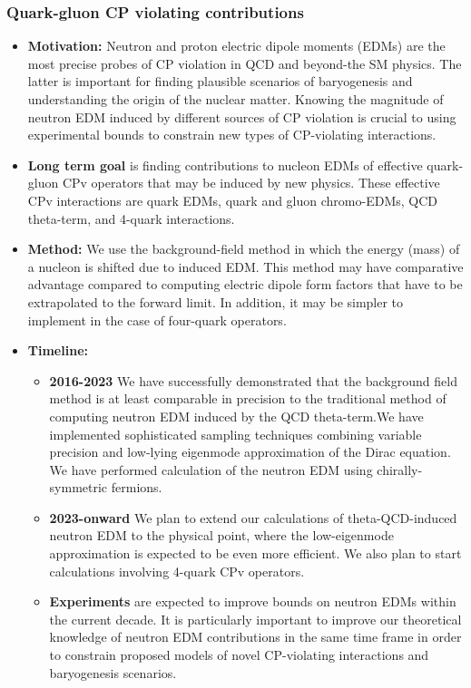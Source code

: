 \documentclass[12pt,hyperpdf]{article}
\begin{document}
\subsubsection{Quark-gluon CP violating contributions}
\begin{itemize}
    \item{\bf Motivation:} Neutron and proton electric dipole moments
      (EDMs) are the most precise probes of CP violation in QCD and
      beyond-the SM physics. The latter is important for finding
      plausible scenarios of baryogenesis and understanding the origin
      of the nuclear matter. Knowing the magnitude of neutron EDM
      induced by different sources of CP violation is crucial to using
      experimental bounds to constrain new types of CP-violating
      interactions. 
    \item{\bf Long term goal} is finding contributions to nucleon EDMs of
      effective quark-gluon CPv operators that may be induced by new
      physics. These effective CPv interactions are quark EDMs, quark
      and gluon chromo-EDMs, QCD theta-term, and 4-quark
      interactions. 
    \item{\bf Method:} We use the background-field method in which the
      energy (mass) of a nucleon is shifted due to induced EDM. This
      method may have comparative advantage compared to computing
      electric dipole form factors that have to be extrapolated to the
      forward limit. In addition, it may be simpler to implement in
      the case of four-quark operators. 
\item{\bf Timeline:}
\begin{itemize}
    \item{\bf 2016-2023} We have successfully demonstrated that the
      background field method is at least comparable in precision to
      the traditional method of computing neutron EDM induced by the
      QCD theta-term.We have implemented sophisticated sampling
      techniques combining variable precision and low-lying eigenmode
      approximation of the Dirac equation. We have performed
      calculation of the neutron EDM using chirally-symmetric
      fermions. 
    \item{\bf 2023-onward} We plan to extend our calculations of
      theta-QCD-induced neutron EDM to the physical point, where the
      low-eigenmode approximation is expected to be even more
      efficient. We also plan to start calculations involving 4-quark
      CPv operators. 
    \item{\bf Experiments} are expected to improve bounds on neutron EDMs
      within the current decade. It is particularly important to
      improve our theoretical knowledge of neutron EDM contributions
      in the same time frame in order to constrain proposed models of
      novel CP-violating interactions and baryogenesis scenarios. 
\end{itemize}
\end{itemize}
\end{document}
